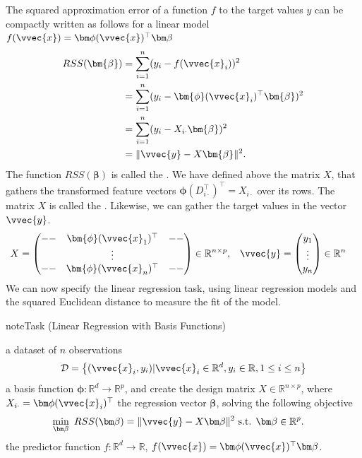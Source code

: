 \documentclass[letterpaper,10pt,english]{jupyterBook}
\begin{document}
\sphinxAtStartPar
The squared approximation error of a function \(f\) to the target values \(y\) can be compactly written as follows for a linear model \(f(\vvec{x})=\bm\phi(\vvec{x})^\top\bm\beta\)
\begin{align*}
    RSS(\bm{\beta}) &= \sum_{i=1}^n(y_i-f(\vvec{x}_i))^2\\
    &= \sum_{i=1}^n(y_i-\bm{\phi}(\vvec{x}_i)^\top\bm{\beta})^2\\
    &= \sum_{i=1}^n(y_i-X_{i\cdot}\bm{\beta})^2\\
    &=\lVert \vvec{y}-X\bm{\beta}\rVert^2.
\end{align*}
\sphinxAtStartPar
The function \(RSS(\bm{\beta})\) is called the . We have defined above the matrix \(X\), that gathers the transformed feature vectors \(\bm{\phi}(D_{i\cdot}^\top)^\top = X_{i\cdot}\) over its rows.
The matrix \(X\) is called the . Likewise, we can gather the target values in the vector \(\vvec{y}\).
\begin{align*}
    X&= 
    \begin{pmatrix}
    -- & \bm{\phi}(\vvec{x}_1)^\top &--\\
    &\vdots&\\
    --& \bm{\phi}(\vvec{x}_n)^\top &--
    \end{pmatrix}
    \in\mathbb{R}^{n\times p},&
    \vvec{y}&=
    \begin{pmatrix}
    y_1\\ \vdots\\ y_n
    \end{pmatrix}
    \in\mathbb{R}^n
\end{align*}
\sphinxAtStartPar
We can now specify the linear regression task, using linear regression models and the squared Euclidean distance to measure the fit of the model.

\begin{sphinxadmonition}{note}{Task (Linear Regression with Basis Functions)}

\sphinxAtStartPar
{} a dataset of \(n\) observations
\begin{equation*}\mathcal{D}=\left\{(\vvec{x}_i,y_i)\vert \vvec{x}_i\in\mathbb{R}^{d}, y_i\in\mathbb{R}, 1\leq i \leq n\right\}\end{equation*}
\sphinxAtStartPar
{} a basis function \(\bm\phi:\mathbb{R}^d\rightarrow \mathbb{R}^p\), and create the design matrix \(X\in\mathbb{R}^{n\times p}\), where \(X_{i\cdot}=\bm\phi(\vvec{x}_i)^\top\) the regression vector \(\bm\beta\), solving the following objective
\begin{align*}
    \min_{\bm\beta} \ RSS(\bm\beta) = \lVert \vvec{y}-X\bm\beta\rVert^2 &\ 
    \text{s.t. } \bm\beta\in\mathbb{R}^p.
\end{align*}
\sphinxAtStartPar
{} the predictor function \(f:\mathbb{R}^d\rightarrow\mathbb{R}\), \(f(\vvec{x})=\bm\phi(\vvec{x})^\top\bm\beta\).
\end{sphinxadmonition}
\end{document}
